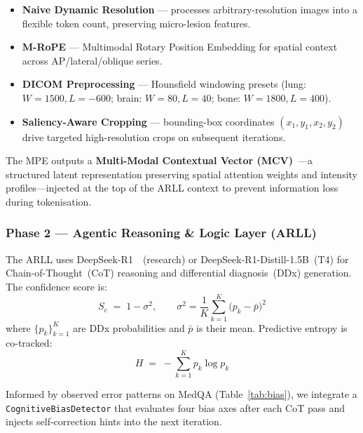 \documentclass[10pt,twocolumn]{article}
\renewcommand\paragraph[1]{%
  \vspace{4pt}\noindent{\color{RMoETeal}\bfseries\small#1\enspace}}
\begin{document}
\begin{itemize}[noitemsep,leftmargin=1em]
  \item \textbf{Naive Dynamic Resolution} — processes arbitrary-resolution images
    into a flexible token count, preserving micro-lesion features.
  \item \textbf{M-RoPE} — Multimodal Rotary Position Embedding for spatial context
    across AP/lateral/oblique series.
  \item \textbf{DICOM Preprocessing} — Hounsfield windowing presets
    (lung: $W{=}1500, L{=}{-}600$; brain: $W{=}80, L{=}40$; bone: $W{=}1800, L{=}400$).
  \item \textbf{Saliency-Aware Cropping} — bounding-box coordinates $(x_1,y_1,x_2,y_2)$
    drive targeted high-resolution crops on subsequent iterations.
\end{itemize}

The MPE outputs a \textbf{Multi-Modal Contextual Vector (MCV)}~\cite{openreview2025icl}—a
structured latent representation preserving spatial attention weights and intensity
profiles—injected at the top of the ARLL context to prevent information loss
during tokenisation.

\subsubsection{Phase 2 — Agentic Reasoning \& Logic Layer (ARLL)}

The ARLL uses DeepSeek-R1~\cite{gao2025deepseek}~(research) or
DeepSeek-R1-Distill-1.5B~(T4) for Chain-of-Thought~(CoT) reasoning and
differential diagnosis~(DDx) generation. The confidence score is:
\begin{equation}
  S_c \;=\; 1 - \sigma^2, \qquad
  \sigma^2 = \frac{1}{K}\sum_{k=1}^{K}\!\bigl(p_k - \bar{p}\bigr)^2
  \label{eq:sc}
\end{equation}
where $\{p_k\}_{k=1}^{K}$ are DDx probabilities and $\bar{p}$ is their mean.
Predictive entropy is co-tracked:
\begin{equation}
  H \;=\; -\sum_{k=1}^{K} p_k \log p_k
  \label{eq:entropy}
\end{equation}

\paragraph{Cognitive Bias Detection.}
Informed by observed error patterns on MedQA (Table~\ref{tab:bias}),
we integrate a \texttt{CognitiveBiasDetector} that evaluates four bias axes after
each CoT pass and injects self-correction hints into the next iteration.
\end{document}
